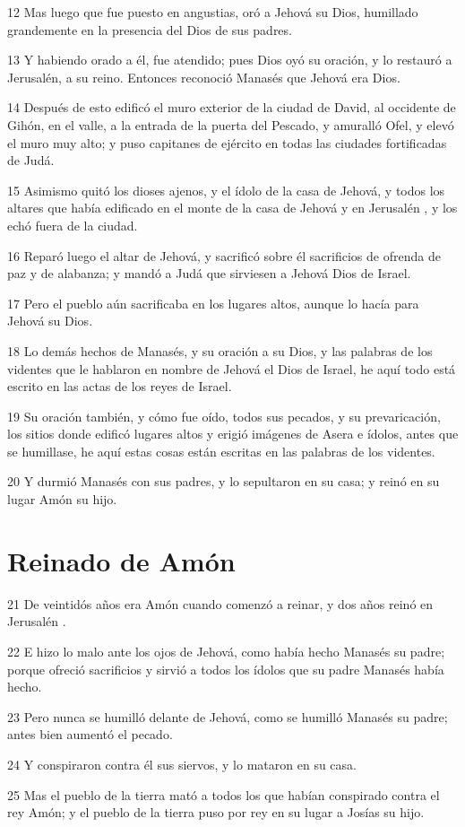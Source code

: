 \par 12 Mas luego que fue puesto en angustias, oró a Jehová su Dios, humillado grandemente en la presencia del Dios de sus padres.
\par 13 Y habiendo orado a él, fue atendido; pues Dios oyó su oración, y lo restauró a Jerusalén, a su reino. Entonces reconoció Manasés que Jehová era Dios.
\par 14 Después de esto edificó el muro exterior de la ciudad de David, al occidente de Gihón, en el valle, a la entrada de la puerta del Pescado, y amuralló Ofel, y elevó el muro muy alto; y puso capitanes de ejército en todas las ciudades fortificadas de Judá.
\par 15 Asimismo quitó los dioses ajenos, y el ídolo de la casa de Jehová, y todos los altares que había edificado en el monte de la casa de Jehová y en Jerusalén , y los echó fuera de la ciudad.
\par 16 Reparó luego el altar de Jehová, y sacrificó sobre él sacrificios de ofrenda de paz y de alabanza; y mandó a Judá que sirviesen a Jehová Dios de Israel.
\par 17 Pero el pueblo aún sacrificaba en los lugares altos, aunque lo hacía para Jehová su Dios.
\par 18 Lo demás hechos de Manasés, y su oración a su Dios, y las palabras de los videntes que le hablaron en nombre de Jehová el Dios de Israel, he aquí todo está escrito en las actas de los reyes de Israel.
\par 19 Su oración también, y cómo fue oído, todos sus pecados, y su prevaricación, los sitios donde edificó lugares altos y erigió imágenes de Asera e ídolos, antes que se humillase, he aquí estas cosas están escritas en las palabras de los videntes.
\par 20 Y durmió Manasés con sus padres, y lo sepultaron en su casa; y reinó en su lugar Amón su hijo.

\section*{Reinado de Amón }

\par 21 De veintidós años era Amón cuando comenzó a reinar, y dos años reinó en Jerusalén .
\par 22 E hizo lo malo ante los ojos de Jehová, como había hecho Manasés su padre; porque ofreció sacrificios y sirvió a todos los ídolos que su padre Manasés había hecho.
\par 23 Pero nunca se humilló delante de Jehová, como se humilló Manasés su padre; antes bien aumentó el pecado.
\par 24 Y conspiraron contra él sus siervos, y lo mataron en su casa.
\par 25 Mas el pueblo de la tierra mató a todos los que habían conspirado contra el rey Amón; y el pueblo de la tierra puso por rey en su lugar a Josías su hijo.

